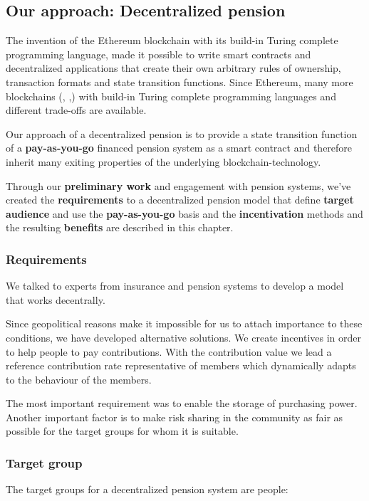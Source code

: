 \subsection{Our approach: Decentralized pension}
The invention of the Ethereum blockchain with its build-in Turing complete programming language, made it possible to write smart contracts and decentralized applications that create their own arbitrary rules of ownership, transaction formats and state transition functions. \cite{buterin2013whitepaper} Since Ethereum, many more blockchains (\cite{hyperledger}, \cite{stellar} ,\cite{cordano}) with build-in Turing complete programming languages and different trade-offs are available.

Our approach of a decentralized pension is to provide a state transition function of a \textbf{pay-as-you-go} financed pension system as a smart contract and therefore inherit many exiting properties of the underlying blockchain-technology.

Through our \textbf{preliminary work} and engagement with pension systems, we've created the \textbf{requirements} to a decentralized pension model that define \textbf{target audience} and use the \textbf{pay-as-you-go} basis and the \textbf{ incentivation} methods and the resulting \textbf{benefits} are described in this chapter.

\subsubsection{Requirements}
We talked to experts from insurance and pension systems to develop a model that works decentrally.

Since geopolitical reasons make it impossible for us to attach importance to these conditions, we have developed alternative solutions.
We create incentives in order to help people to pay contributions. With the contribution value we lead a reference contribution rate representative of members which dynamically adapts to the behaviour of the members.

The most important requirement was to enable the storage of purchasing power. Another important factor is to make risk sharing in the community as fair as possible for the target groups for whom it is suitable.

\subsubsection{Target group}
The target groups for a decentralized pension system are people:

